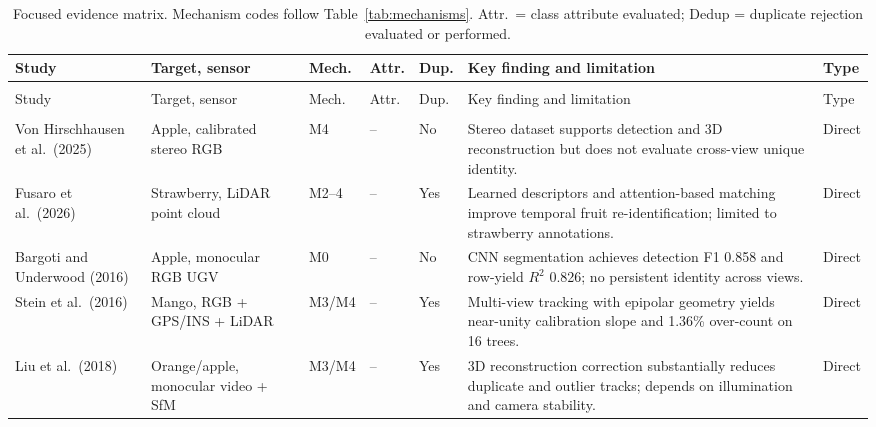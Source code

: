 \footnotesize
\setlength{\LTleft}{0pt}
\setlength{\LTright}{0pt}
\setlength{\tabcolsep}{2pt}
\begin{longtable}{@{}>{\raggedright\arraybackslash}p{}>{\raggedright\arraybackslash}p{}>{\raggedright\arraybackslash}p{}>{\raggedright\arraybackslash}p{}>{\raggedright\arraybackslash}p{}>{\raggedright\arraybackslash}p{}>{\raggedright\arraybackslash}p{}@{}}
\caption{Focused evidence matrix. Mechanism codes follow Table~\ref{tab:mechanisms}. Attr.\ = class attribute evaluated; Dedup = duplicate rejection evaluated or performed.}\label{tab:matrix}\\
\toprule
Study & Target, sensor & Mech. & Attr. & Dup. & Key finding and limitation & Type\\
\midrule
\endfirsthead
\multicolumn{7}{c}{\tablename\ \thetable{} continued}\\
\toprule
Study & Target, sensor & Mech. & Attr. & Dup. & Key finding and limitation & Type\\
\midrule
\endhead
\midrule
\multicolumn{7}{r}{Continued on next page}\\
\endfoot
\bottomrule
\endlastfoot

Von Hirschhausen et al.\ (2025) \cite{ledger_m_3f8f02033fe9db3a}
& Apple, calibrated stereo RGB
& M4 & -- & No
& Stereo dataset supports detection and 3D reconstruction but does not evaluate cross-view unique identity.
& Direct\\

Fusaro et al.\ (2026) \cite{ledger_r_0eda6374aaf85fae}
& Strawberry, LiDAR point cloud
& M2--4 & -- & Yes
& Learned descriptors and attention-based matching improve temporal fruit re-identification; limited to strawberry annotations.
& Direct\\

Bargoti and Underwood (2016) \cite{ledger_r_143d70deec8d2b1d}
& Apple, monocular RGB UGV
& M0 & -- & No
& CNN segmentation achieves detection F1 0.858 and row-yield $R^2$ 0.826; no persistent identity across views.
& Direct\\

Stein et al.\ (2016) \cite{ledger_r_408d13511cac4177}
& Mango, RGB + GPS/INS + LiDAR
& M3/M4 & -- & Yes
& Multi-view tracking with epipolar geometry yields near-unity calibration slope and 1.36\% over-count on 16 trees.
& Direct\\

Liu et al.\ (2018) \cite{ledger_m_9966d81433d61ed3}
& Orange/apple, monocular video + SfM
& M3/M4 & -- & Yes
& 3D reconstruction correction substantially reduces duplicate and outlier tracks; depends on illumination and camera stability.
& Direct\\


\end{longtable}
